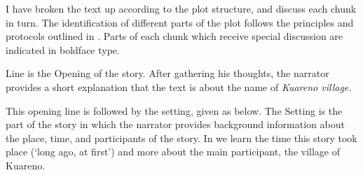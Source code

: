 I have broken the text up according to the plot structure,
and discuss each chunk in turn.
The identification of different parts of the
plot follows the principles and protocols outlined in \citet{dole01}.
Parts of each chunk which receive special discussion
are indicated in boldface type.

Line  is the Opening of the story.
After gathering his thoughts,
the narrator provides a short explanation that the text
is about the name of \it{Kuareno{\Q}} village.

\begin{exe}
	\label{ex:130823-2, 0.00}
\end{exe}

This opening line is followed by the setting,
given as  below.
The Setting is the part of the story in which the narrator provides
background information about the place, time, and participants of the story.
In  we learn the time this story
took place (`long ago, at first') and more about the main participant, the village of Kuareno{\Q}.

\begin{exe}
	\label{ex:130823-2, 0.09-0.17}
	\begin{xlist}
		\label{ex:130823-2, 0.09}
		\label{ex:130823-2, 0.13}
		\label{ex:130823-2, 0.17}
	\end{xlist}
\end{exe}

